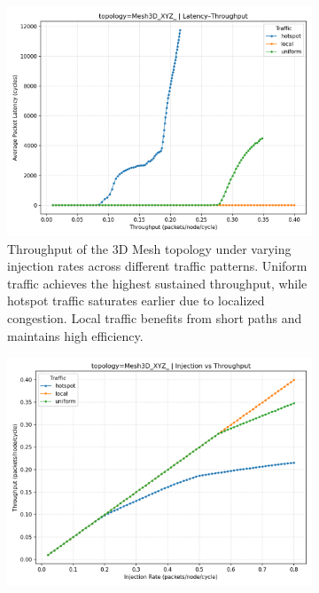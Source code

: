 \documentclass[11pt]{article}
\begin{document}
\begin{figure}[htbp]
    \centering
    \begin{subfigure}[t]{0.45\linewidth}
        \centering
        \includegraphics[width=\linewidth]{./figs/Mesh3D-traffic.png}
        \caption{Throughput of the 3D Mesh topology under varying injection rates across different traffic patterns. Uniform traffic achieves the highest sustained throughput, while hotspot traffic saturates earlier due to localized congestion. Local traffic benefits from short paths and maintains high efficiency.}
        \label{fig:mesh3d-throughput}
    \end{subfigure}
    \hfill
    \begin{subfigure}[t]{0.45\linewidth}
        \centering
        \includegraphics[width=\linewidth]{./figs/Mesh3D-inj_rate-throughput.png}

\end{subfigure}
\end{figure}
\end{document}

